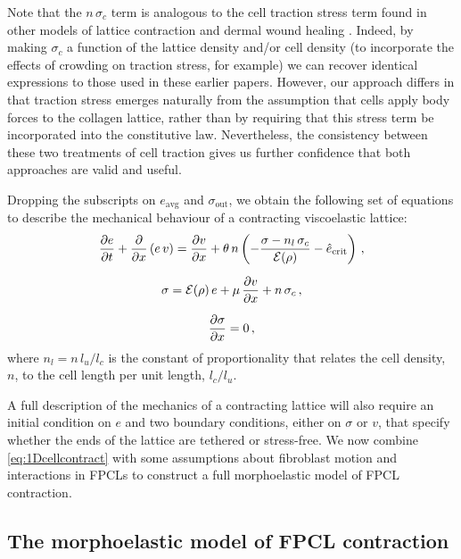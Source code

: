 Note that the $n \, \sigma_c$ term is analogous to the cell traction stress term found in other models of lattice contraction and dermal wound healing \citep{Moon1993,Tranquillo1992,Ferrenq1997,Tracqui1995}. Indeed, by making $\sigma_c$ a function of the lattice density and/or cell density (to incorporate the effects of crowding on traction stress, for example) we can recover identical expressions to those used in these earlier papers. However, our approach differs in that traction stress emerges naturally from the assumption that cells apply body forces to the collagen lattice, rather than by requiring that this stress term be incorporated into the constitutive law. Nevertheless, the consistency between these two treatments of cell traction gives us further confidence that both approaches are valid and useful.

Dropping the subscripts on $e_\text{avg}$ and $\sigma_\text{out}$, we obtain the following set of equations to describe the mechanical behaviour of a contracting viscoelastic lattice:
\begin{subequations}
\label{eq:1Dcellcontract}
\begin{gather}
  \label{eq:strain}
  \frac{\partial e}{\partial t} + \frac{\partial }{\partial x} \left(e\,v\right) = \frac{\partial v}{\partial x} + \theta\, n \left(-\frac{\sigma - n_{l} \, \sigma_{c}}{\mathcal{E}(\rho)} - \hat{e}_\text{crit}\right)\,, \\[6pt]
  \label{eq:stress}
  \sigma = \mathcal{E}(\rho) \, e + \mu\,\frac{\partial v}{\partial x} + n \, \sigma_c\,, \\[6pt]
  \label{eq:forcebalance}
  \frac{\partial \sigma}{\partial x} = 0\,,
\end{gather}
\end{subequations}
where $n_{l} = n \, l_u / l_c$ is the constant of proportionality that relates the cell density, $n$, to the cell length per unit length, $l_c / l_u$.

A full description of the mechanics of a contracting lattice will also require an initial condition on $e$ and two boundary conditions, either on $\sigma$ or $v$, that specify whether the ends of the lattice are tethered or stress-free. We now combine \eqref{eq:1Dcellcontract} with some assumptions about fibroblast motion and interactions in FPCLs to construct a full morphoelastic model of FPCL contraction.

\subsection{The morphoelastic model of FPCL contraction}
\label{SS:extendedmodel}


